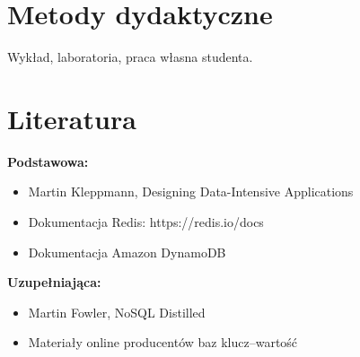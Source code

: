 \documentclass[12pt, a4paper]{article}
\begin{document}
\section{Metody dydaktyczne}

Wykład, laboratoria, praca własna studenta.

\section{Literatura}

\textbf{Podstawowa:}
\begin{itemize}
  \item Martin Kleppmann, Designing Data-Intensive Applications
  \item Dokumentacja Redis: https://redis.io/docs
  \item Dokumentacja Amazon DynamoDB
\end{itemize}

\textbf{Uzupełniająca:}
\begin{itemize}
  \item Martin Fowler, NoSQL Distilled
  \item Materiały online producentów baz klucz–wartość
\end{itemize}
\end{document}
